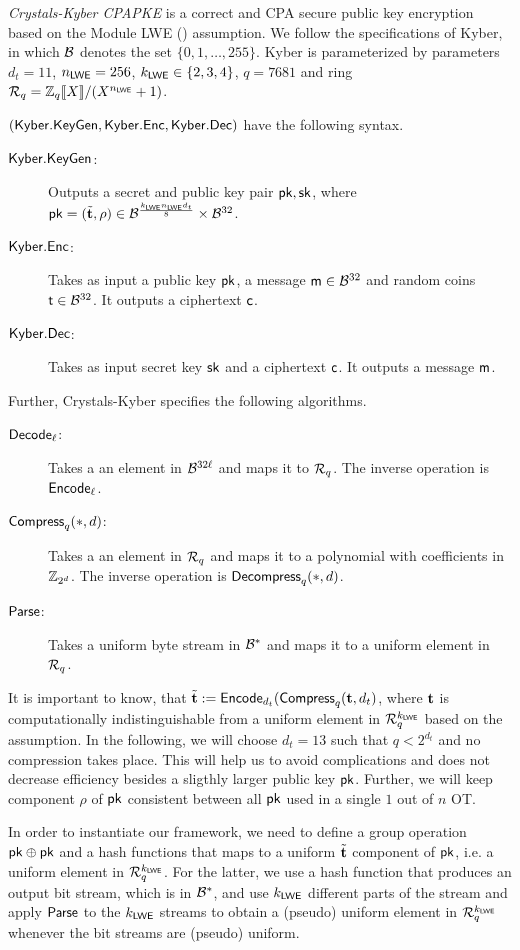\begin{definition}
\emph{ Crystals-Kyber CPAPKE} is a correct and CPA secure public key encryption based on the Module LWE (\MLWE) assumption. We follow the specifications of Kyber, in which $\mathcal{B}$ denotes the  set $\{0,1,\ldots,255\}$. Kyber is parameterized by parameters $d_t=11$, $n_{\mathsf{LWE}}=256$, $k_{\mathsf{LWE}}\in\{2,3,4\}$, $q=7681$ and ring $\mathcal R_q=\mathbb Z_q\llbracket X\rrbracket/(X^{n_{\mathsf{LWE}}}+1)$. 

$(\mathsf{Kyber.KeyGen},\mathsf{Kyber.Enc},\mathsf{Kyber.Dec})$ have the following syntax. 
\begin{description}
\item[$\mathsf{Kyber.KeyGen}$:] Outputs a secret and public key pair $\mathsf{pk},\mathsf{sk}$, where $\mathsf{pk}=(\tilde{{\mathbf t}},\rho)\in\mathcal{B}^{\frac{k_{\mathsf{LWE}}n_{\mathsf{LWE}} d_t}{8}}\times\mathcal{B}^{32}$.
\item[$\mathsf{Kyber.Enc}$:] Takes as input a public key $\mathsf{pk}$, a message $\mathsf{m}\in\mathcal{B}^{32}$ and random coins $\mathsf{t}\in\mathcal{B}^{32}$. It outputs a ciphertext $\mathsf{c}$.
\item[$\mathsf{Kyber.Dec}$:] Takes as input secret key $\mathsf{sk}$ and a ciphertext $\mathsf{c}$. It outputs a message $\mathsf{m}$.
\end{description}
Further, Crystals-Kyber specifies the following algorithms.
\begin{description}
\item[$\mathsf{Decode}_\ell$:] Takes a an element in $\mathcal{B}^{32\ell}$ and maps it to $\mathcal R_q$. The inverse operation is $\mathsf{Encode}_\ell$.
\item[$\mathsf{Compress}_q(*,d)$:] Takes a an element in $\mathcal R_q$ and maps it to a polynomial with coefficients in $\mathbb Z_{2^d}$. The inverse operation is $\mathsf{Decompress}_q(*,d)$.
\item[$\mathsf{Parse}$:] Takes a uniform byte stream in $\mathcal{B}^{*}$ and maps it to a uniform element in $\mathcal R_q$.
\end{description}
\end{definition}

It is important to know, that $\tilde{{\mathbf t}}:=\mathsf{Encode}_{d_t}(\mathsf{Compress}_q({\mathbf t}, d_t)$, where ${\mathbf t}$ is computationally indistinguishable from a uniform element in $\mathcal R_q^{k_{\mathsf{LWE}}}$ based on the \MLWE assumption. In the following, we will choose $d_t=13$ such that $q<2^{d_t}$ and no compression takes place. This will help us to avoid complications and does not decrease efficiency besides a sligthly larger public key $\mathsf{pk}$. Further, we will keep component $\rho$ of $\mathsf{pk}$ consistent between all $\mathsf{pk}$ used in a single $1$ out of $n$ OT.

In order to instantiate our framework, we need to define a group operation $\mathsf{pk}\oplus\mathsf{pk}$ and a hash functions that maps to a uniform $\tilde{{\mathbf t}}$ component of $\mathsf{pk}$, i.e. a uniform element in $\mathcal R_q^{k_{\mathsf{LWE}}}$. For the latter, we use a hash function that produces an output bit stream, which is in $\mathcal{B}^{*}$, and use $k_{\mathsf{LWE}}$ different parts of the stream and apply $\mathsf{Parse}$ to the $k_{\mathsf{LWE}}$ streams to obtain a (pseudo) uniform element in $\mathcal R_q^{k_{\mathsf{LWE}}}$ whenever the bit streams are (pseudo) uniform.

